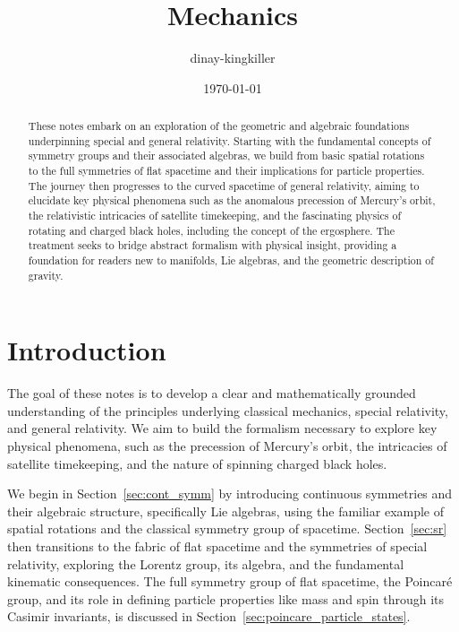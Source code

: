 \documentclass{amsart}
\theoremstyle{definition}
\theoremstyle{remark}
\begin{document}
\title{Mechanics}
\author{dinay-kingkiller}
\date{\today}

\begin{abstract}
  These notes embark on an exploration of the geometric and algebraic foundations underpinning special and general relativity. Starting with the fundamental concepts of symmetry groups and their associated algebras, we build from basic spatial rotations to the full symmetries of flat spacetime and their implications for particle properties. The journey then progresses to the curved spacetime of general relativity, aiming to elucidate key physical phenomena such as the anomalous precession of Mercury's orbit, the relativistic intricacies of satellite timekeeping, and the fascinating physics of rotating and charged black holes, including the concept of the ergosphere. The treatment seeks to bridge abstract formalism with physical insight, providing a foundation for readers new to manifolds, Lie algebras, and the geometric description of gravity.
\end{abstract}

\maketitle

\section{Introduction}
\label{sec:intro}

The goal of these notes is to develop a clear and mathematically grounded understanding of the principles underlying classical mechanics, special relativity, and general relativity. We aim to build the formalism necessary to explore key physical phenomena, such as the precession of Mercury's orbit, the intricacies of satellite timekeeping, and the nature of spinning charged black holes.

We begin in Section~\ref{sec:cont_symm} by introducing continuous symmetries and their algebraic structure, specifically Lie algebras, using the familiar example of spatial rotations and the classical symmetry group of spacetime. Section~\ref{sec:sr} then transitions to the fabric of flat spacetime and the symmetries of special relativity, exploring the Lorentz group, its algebra, and the fundamental kinematic consequences. The full symmetry group of flat spacetime, the Poincaré group, and its role in defining particle properties like mass and spin through its Casimir invariants, is discussed in Section~\ref{sec:poincare_particle_states}.
\end{document}
